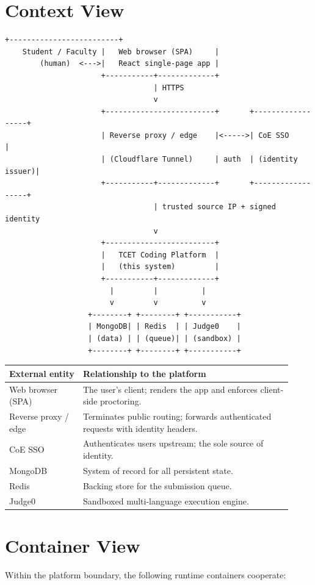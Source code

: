 \documentclass[12pt,a4paper,oneside]{report}
\begin{document}
\section{Context View}
\begin{lstlisting}[language={}]
                      +-------------------------+
    Student / Faculty |   Web browser (SPA)     |
        (human)  <--->|   React single-page app |
                      +-----------+-------------+
                                  | HTTPS
                                  v
                      +-------------------------+       +------------------+
                      | Reverse proxy / edge    |<----->| CoE SSO          |
                      | (Cloudflare Tunnel)     | auth  | (identity issuer)|
                      +-----------+-------------+       +------------------+
                                  | trusted source IP + signed identity
                                  v
                      +-------------------------+
                      |   TCET Coding Platform  |
                      |   (this system)         |
                      +-----------+-------------+
                        |         |          |
                        v         v          v
                   +--------+ +--------+ +-----------+
                   | MongoDB| | Redis  | | Judge0    |
                   | (data) | | (queue)| | (sandbox) |
                   +--------+ +--------+ +-----------+
\end{lstlisting}

\begin{longtable}{@{}p{0.24\linewidth} p{0.68\linewidth}@{}}
\toprule
\textbf{External entity} & \textbf{Relationship to the platform}\\
\midrule
\endhead
Web browser (SPA) & The user's client; renders the app and enforces client-side proctoring.\\
Reverse proxy / edge & Terminates public routing; forwards authenticated requests with identity headers.\\
CoE SSO & Authenticates users upstream; the sole source of identity.\\
MongoDB & System of record for all persistent state.\\
Redis & Backing store for the submission queue.\\
Judge0 & Sandboxed multi-language execution engine.\\
\bottomrule
\end{longtable}

\section{Container View}
Within the platform boundary, the following runtime containers cooperate:
\end{document}
